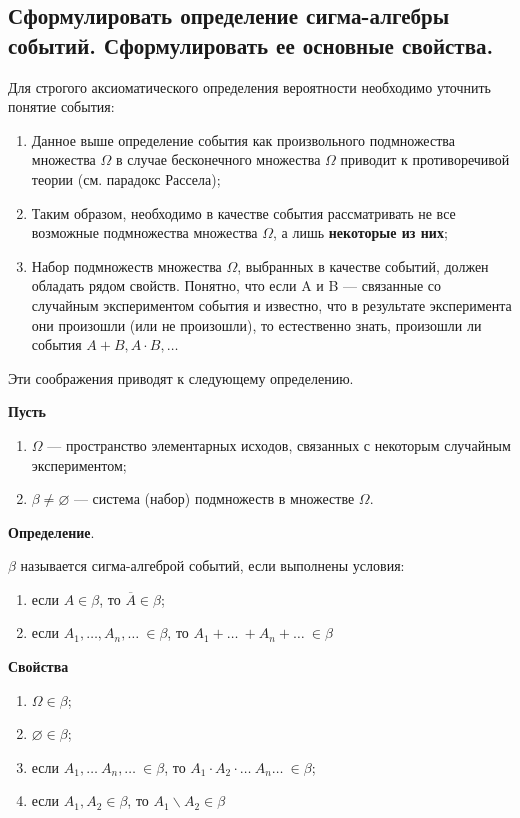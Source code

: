 \subsection{Сформулировать определение сигма-алгебры событий. Сформулировать ее основные свойства.}

Для строгого аксиоматического определения вероятности необходимо уточнить понятие события:

\begin{enumerate}
	\item Данное выше определение события как произвольного подмножества множества $\Omega$ в случае бесконечного множества $\Omega$ приводит к противоречивой теории (см. парадокс Рассела);
	\item Таким образом, необходимо в качестве события рассматривать не все возможные подмножества множества $\Omega$, а лишь \textbf{некоторые из них}; 
	\item Набор подмножеств множества $\Omega$, выбранных в качестве событий, должен обладать рядом свойств. Понятно, что если A и B --- связанные со случайным экспериментом события и известно, что в результате эксперимента они произошли (или не произошли), то естественно знать, произошли ли события $A + B, A \cdot B, \dots$
\end{enumerate}

Эти соображения приводят к следующему определению.

\textbf{Пусть} 

\begin{enumerate}
	\item $\Omega$ --- пространство элементарных исходов, связанных с некоторым случайным экспериментом; 
	\item $\beta \neq \varnothing$ --- система (набор) подмножеств в множестве $\Omega$.
\end{enumerate}


\textbf{Определение}. 

$\beta$ называется сигма-алгеброй событий, если выполнены условия: 
\begin{enumerate}
	\item если $A \in \beta$, то $\overline{A} \in \beta$;
	\item если $A_1, \dots, A_n, \dots\ \in \beta$, то $A_1 + \dots\ + A_n + \dots\ \in \beta$
\end{enumerate}

\textbf{Свойства}

\begin{enumerate}
	
	\item $\Omega \in \beta$;
	\item $\varnothing \in \beta$;
	\item если $A_1, \dots\ A_n, \dots\ \in \beta$, то $A_1 \cdot A_2 \cdot \dots\ A_n \dots\ \in \beta$;
	\item если $A_1, A_2 \in \beta$, то $A_1 \backslash A_2 \in \beta$
\end{enumerate}


